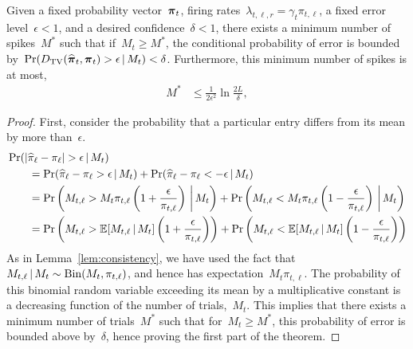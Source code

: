 \begin{theorem}
Given a fixed probability vector~$\boldsymbol{\pi}_t$,
firing rates~$\lambda_{t,\ell,r} = \gamma_t \pi_{t,\ell}$, a fixed 
error level~$\epsilon < 1$, and a desired confidence~$\delta < 1$, 
there exists a minimum number of spikes~$M^*$ such that if~$M_t \geq M^*$,
the conditional probability of error is bounded 
by~$\Pr({D_{\mathrm{TV}}}(\widehat{\boldsymbol{\pi}}_t, \boldsymbol{\pi}_t) > \epsilon \,|\, M_t) < \delta$.
Furthermore, this minimum number of spikes is at most,
\begin{align}
M^* &\leq \frac{1}{2\epsilon^2} \ln \frac{2L}{\delta},  
\end{align}
\end{theorem}

\begin{proof}
First, consider the probability that a particular entry differs from its mean by more than~$\epsilon$.
\begin{align}
  &\Pr(|\widehat{\pi}_\ell - \pi_\ell |  > \epsilon \,|\, M_t) \\
  &\qquad= \Pr(\widehat{\pi}_\ell - \pi_\ell  > \epsilon \,|\, M_t) + 
  \Pr(\widehat{\pi}_\ell - \pi_\ell  < -\epsilon \,|\, M_t) \\
  &\qquad= \Pr \left(M_{t, \ell} > M_t \pi_{t, \ell} \left(1+\frac{\epsilon}{\pi_{t, \ell}} \right) \, \bigg| \, M_t \right) 
  +\Pr \left(M_{t, \ell} < M_t \pi_{t, \ell} \left(1-\frac{\epsilon}{\pi_{t, \ell}} \right) \, \bigg| \, M_t\right) \\
  &\qquad= \Pr \left(M_{t, \ell} > \mathbb{E}[M_{t,\ell} \,|\, M_t] \left(1+\frac{\epsilon}{\pi_{t, \ell}} \right) \right) 
   +\Pr \left(M_{t, \ell} < \mathbb{E}[M_{t,\ell} \,|\, M_t] \left(1-\frac{\epsilon}{\pi_{t, \ell}} \right) \right)
\end{align}
As in Lemma~\ref{lem:consistency}, we have used the fact
that~$M_{t, \ell} \,|\, M_t \sim \mathrm{Bin}(M_t, \pi_{t, \ell})$,
and hence has expectation~$M_t \pi_{t, \ell}$. 
The probability of this binomial random variable exceeding its mean 
by a multiplicative constant is a decreasing function of the 
number of trials,~$M_t$. This implies that there exists a minimum 
number of trials~$M^*$ such that for~$M_t \geq M^*$, this probability 
of error is bounded above by~$\delta$, hence proving the first part 
of the theorem.


\end{proof}
